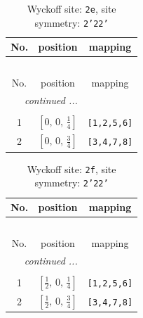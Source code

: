 \documentclass[fleqn,8pt]{jsarticle}
\begin{document}
\begin{longtable}{ccc}
\caption{Wyckoff site: {\tt 2e}, site symmetry: {\tt 2'22'}}
 \\
 \hline \hline
No. & position & mapping \\ \hline \endfirsthead

\multicolumn{2}{l}{\tablename\ \thetable{}} \\
 \hline \hline
No. & position & mapping \\ \hline \endhead

 \hline \hline
\multicolumn{2}{r}{\footnotesize\it continued ...} \\ \endfoot

 \hline \hline
\multicolumn{2}{r}{} \\ \endlastfoot

1 & $\left[ 0,\, 0,\, \frac{1}{4} \right]$ & {\tt [1,2,5,6]} \\ \hline
2 & $\left[ 0,\, 0,\, \frac{3}{4} \right]$ & {\tt [3,4,7,8]} \\
\end{longtable}
\renewcommand{\arraystretch}{1.2}
\begin{longtable}{ccc}
\caption{Wyckoff site: {\tt 2f}, site symmetry: {\tt 2'22'}}
 \\
 \hline \hline
No. & position & mapping \\ \hline \endfirsthead

\multicolumn{2}{l}{\tablename\ \thetable{}} \\
 \hline \hline
No. & position & mapping \\ \hline \endhead

 \hline \hline
\multicolumn{2}{r}{\footnotesize\it continued ...} \\ \endfoot

 \hline \hline
\multicolumn{2}{r}{} \\ \endlastfoot

1 & $\left[ \frac{1}{2},\, 0,\, \frac{1}{4} \right]$ & {\tt [1,2,5,6]} \\ \hline
2 & $\left[ \frac{1}{2},\, 0,\, \frac{3}{4} \right]$ & {\tt [3,4,7,8]} \\
\end{longtable}
\renewcommand{\arraystretch}{1.2}
\end{document}
